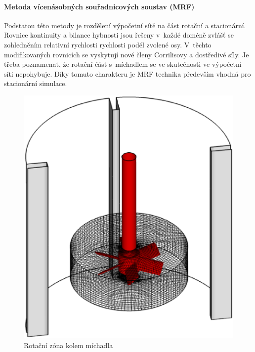 \paragraph{Metoda vícenásobných souřadnicových soustav (MRF)}
Podstatou této metody je rozdělení výpočetní sítě na část rotační a stacionární. Rovnice kontinuity a bilance hybnosti jsou řešeny v~každé doméně zvlášť se zohledněním relativní rychlosti rychlosti podél zvolené osy. V~těchto modifikovaných rovnicích se vyskytují nové členy  Corrilisovy a dostředivé síly. Je třeba poznamenat, že rotační část s~míchadlem se ve skutečnosti ve výpočetní síti nepohybuje. Díky tomuto charakteru je MRF technika především vhodná pro stacionární simulace.

\begin{figure}[h!]
\centering
  \includegraphics[scale=0.35]{images/sm.eps}
  \caption{Rotační zóna kolem míchadla}
  \label{fig:mrf}
\end{figure} 

